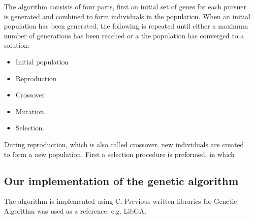 The algorithm consists of four parts, first an initial set of genes for each pursuer is generated and combined to form individuals in the population. When an initial population has been generated, the following is repeated until either a maximum number of generations has been reached or a the population has converged to a solution:\\
\begin{itemize}
\item Initial population
\item Reproduction%
\item Crossover
\item Mutation.%
\item Selection. %

\end{itemize}
During reproduction, which is also called crossover, new individuals are created to form a new population. First a selection procedure is preformed, in which 

\subsection{Our implementation of the genetic algorithm}
The algorithm is implemented using C. Previous written libraries for Genetic Algorithm was used as a reference, e.g. LibGA.

